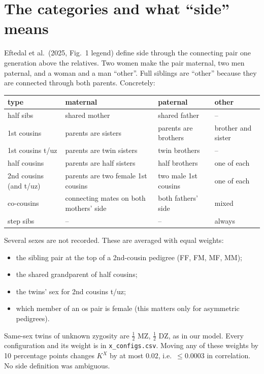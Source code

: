 \documentclass[11pt]{article}
\newcommand{\Kx}{K^{X}}
\begin{document}
\section{The categories and what ``side'' means}\label{sec:side}
Eftedal et al.\ (2025, Fig.~1 legend) define side through the connecting pair one generation above the
relatives. Two women make the pair maternal, two men paternal, and a woman and a man ``other''. Full siblings
are ``other'' because they are connected through both parents. Concretely:

\begin{center}\footnotesize
\begin{tabular}{llll}\toprule
type & maternal & paternal & other\\\midrule
half sibs & shared mother & shared father & --\\
1st cousins & parents are sisters & parents are brothers & brother and sister\\
1st cousins t/uz & parents are twin sisters & twin brothers & --\\
half cousins & parents are half sisters & half brothers & one of each\\
2nd cousins (and t/uz) & parents are two female 1st cousins & two male 1st cousins & one of each\\
co-cousins & connecting mates on both mothers' side & both fathers' side & mixed\\
step sibs & -- & -- & always\\\bottomrule
\end{tabular}
\end{center}

Several sexes are not recorded. These are averaged with equal weights:
\begin{itemize}
  \item the sibling pair at the top of a 2nd-cousin pedigree (FF, FM, MF, MM);
  \item the shared grandparent of half cousins;
  \item the twins' sex for 2nd cousins t/uz;
  \item which member of an os pair is female (this matters only for asymmetric pedigrees).
\end{itemize}
Same-sex twins of unknown zygosity are $\tfrac12$ MZ, $\tfrac12$ DZ, as in our model. Every configuration and
its weight is in \texttt{x\_configs.csv}. Moving any of these weights by 10 percentage points changes $\Kx$ by
at most $0.02$, i.e.\ $\le0.0003$ in correlation. No side definition was ambiguous.
\end{document}
